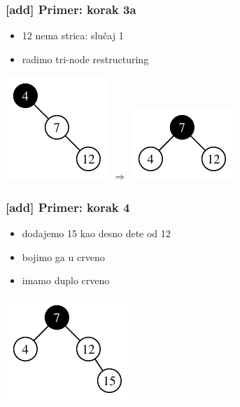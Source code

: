 \documentclass[compress]{beamer}
\begin{document}
\begin{frame}[fragile]
  \frametitle{[add] Primer: korak 3a}
  \begin{itemize}
    \item 12 nema strica: slučaj 1
    \item radimo tri-node restructuring
  \end{itemize}
  \begin{center}
    \includegraphics[scale=1.0]{asp-11-add-03.pdf} $\Rightarrow$
    \includegraphics[scale=1.0]{asp-11-add-04.pdf}
  \end{center}
\end{frame}

\begin{frame}[fragile]
  \frametitle{[add] Primer: korak 4}
  \begin{itemize}
    \item dodajemo 15 kao desno dete od 12
    \item bojimo ga u crveno
    \item imamo duplo crveno
  \end{itemize}
  \begin{center}
    \includegraphics[scale=1.0]{asp-11-add-05.pdf}
  \end{center}
\end{frame}
\end{document}
